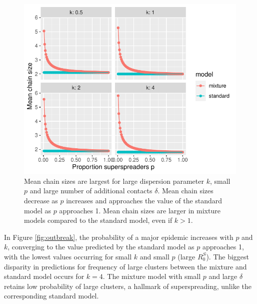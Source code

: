 \documentclass{imammb}
\numberwithin{equation}{section}
\begin{document}
\begin{figure}
    \centering
    \includegraphics{Figure6.pdf}
    \caption{Mean chain sizes are largest for large dispersion parameter $k$, small $p$ and large number of additional contacts $\delta$. Mean chain sizes decrease as $p$ increases and approaches the value of the standard model as $p$ approaches 1. Mean chain sizes are larger in mixture models compared to the standard model, even if $k>1$. }
    \label{fig:meanchain}
\end{figure}

 
  In Figure \ref{fig:outbreak}, the probability of a major epidemic increases with $p$ and $k$, converging to the value predicted by the standard model as $p$ approaches 1, with the lowest values occurring for small $k$ and small $p$ (large $R_0^S$). The biggest disparity in predictions for frequency of large clusters between the mixture and standard model occurs for $k=4$. The mixture model with small $p$ and large $\delta$ retains low probability of large clusters, a hallmark of superspreading,  unlike  the corresponding standard model.
  
\end{document}

